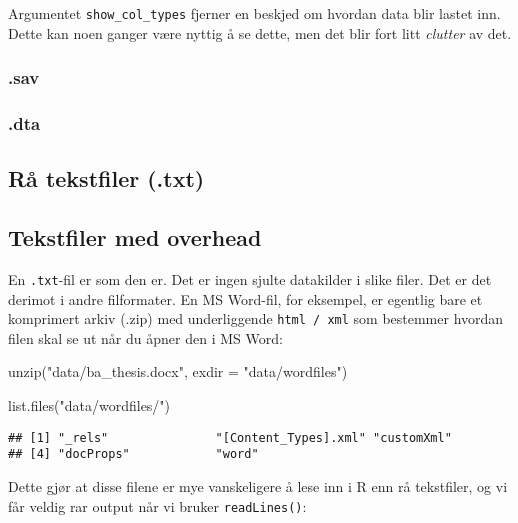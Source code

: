 \documentclass[
]{article}
\newenvironment{Shaded}{\begin{snugshade}}{\end{snugshade}}
\newcommand{\AttributeTok}[1]{\textcolor[rgb]{0.77,0.63,0.00}{#1}}
\newcommand{\FunctionTok}[1]{\textcolor[rgb]{0.00,0.00,0.00}{#1}}
\newcommand{\NormalTok}[1]{#1}
\newcommand{\StringTok}[1]{\textcolor[rgb]{0.31,0.60,0.02}{#1}}
\begin{document}
Argumentet \texttt{show\_col\_types} fjerner en beskjed om hvordan data
blir lastet inn. Dette kan noen ganger være nyttig å se dette, men det
blir fort litt \emph{clutter} av det.

\hypertarget{sav}{%
\subsubsection{.sav}\label{sav}}

\hypertarget{dta}{%
\subsubsection{.dta}\label{dta}}

\hypertarget{ruxe5-tekstfiler-.txt}{%
\subsection{Rå tekstfiler (.txt)}\label{ruxe5-tekstfiler-.txt}}

\hypertarget{tekstfiler-med-overhead}{%
\subsection{Tekstfiler med overhead}\label{tekstfiler-med-overhead}}

En \texttt{.txt}-fil er som den er. Det er ingen sjulte datakilder i
slike filer. Det er det derimot i andre filformater. En MS Word-fil, for
eksempel, er egentlig bare et komprimert arkiv (.zip) med underliggende
\texttt{html\ /\ xml} som bestemmer hvordan filen skal se ut når du
åpner den i MS Word:

\begin{Shaded}
\begin{Highlighting}[]
\FunctionTok{unzip}\NormalTok{(}\StringTok{"data/ba\_thesis.docx"}\NormalTok{, }\AttributeTok{exdir =} \StringTok{"data/wordfiles"}\NormalTok{)}

\FunctionTok{list.files}\NormalTok{(}\StringTok{"data/wordfiles/"}\NormalTok{)}
\end{Highlighting}
\end{Shaded}

\begin{verbatim}
## [1] "_rels"               "[Content_Types].xml" "customXml"          
## [4] "docProps"            "word"
\end{verbatim}

Dette gjør at disse filene er mye vanskeligere å lese inn i R enn rå
tekstfiler, og vi får veldig rar output når vi bruker
\texttt{readLines()}:
\end{document}
